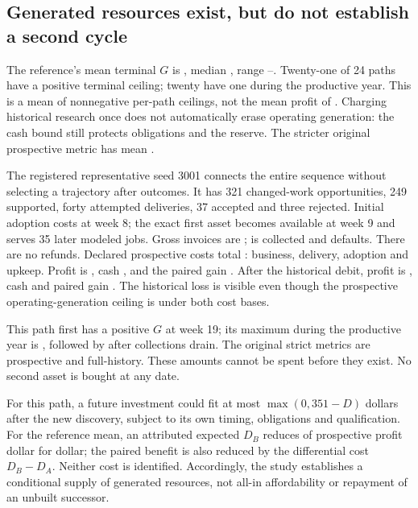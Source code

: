 \subsection{Generated resources exist, but do not establish a second cycle}
The reference's mean terminal \(G\) is , median , range
--. Twenty-one of 24 paths have a positive terminal ceiling; twenty
have one during the productive year. This is a mean of nonnegative per-path ceilings, not
the mean profit of . Charging historical research once does not automatically
erase operating generation: the cash bound still protects obligations and the reserve.
The stricter original prospective metric has mean .

The registered representative seed 3001 connects the entire sequence without selecting a
trajectory after outcomes. It has 321 changed-work opportunities, 249 supported, forty attempted
deliveries, 37 accepted and three rejected. Initial adoption costs  at week 8;
the exact first asset becomes available at week 9 and serves 35 later modeled jobs.
Gross invoices are ;  is collected and  defaults.
There are no refunds. Declared prospective costs total :  business,
 delivery,  adoption and  upkeep.
Profit is , cash , and the paired gain .
After the historical debit, profit is , cash  and paired gain
. The historical loss is visible even though the prospective operating-generation
ceiling is  under both cost bases.

This path first has a positive \(G\) at week 19; its maximum during the productive year is
, followed by  after collections drain. The original strict metrics are
 prospective and  full-history. These amounts cannot be spent before
they exist. No second asset is bought at any date.

For this path, a future investment could fit at most \(\max(0,351-D)\) dollars after the new
discovery, subject to its own timing, obligations and qualification. For the reference mean,
an attributed expected \(D_B\) reduces  of prospective profit dollar for dollar;
the paired benefit is also reduced by the differential cost \(D_B-D_A\). Neither cost is
identified. Accordingly, the study establishes a conditional supply of generated resources,
not all-in affordability or repayment of an unbuilt successor.
